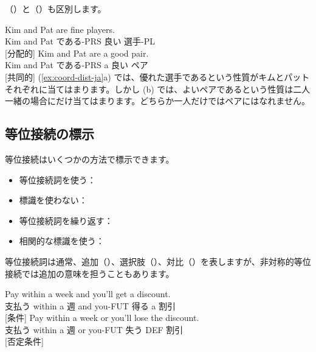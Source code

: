 （）と（）も区別します。

\ea \label{ex:coord-dist-ja}
    \ea \gll Kim and Pat are fine players.\\
        Kim and Pat である-PRS 良い 選手-PL\\
    \glt {} [分配的]
    \ex \gll Kim and Pat are a good pair.\\
        Kim and Pat である-PRS a 良い ペア\\
    \glt {} [共同的]
    \z
\z
(\ref{ex:coord-dist-ja}a) では、優れた選手であるという性質がキムとパットそれぞれに当てはまります。しかし (b) では、よいペアであるという性質は二人一緒の場合にだけ当てはまります。どちらか一人だけではペアにはなれません。

\subsection{等位接続の標示}

等位接続はいくつかの方法で標示できます。
\begin{itemize}[noitemsep]
    \item 等位接続詞を使う：
    \item 標識を使わない：
    \item 等位接続詞を繰り返す：
    \item 相関的な標識を使う：
\end{itemize}

等位接続詞は通常、追加（）、選択肢（）、対比（）を表しますが、非対称的等位接続では追加の意味を担うこともあります。

\ea \label{ex:coord-meaning-ja}
    \ea \gll Pay within a week and you'll get a discount.\\
        支払う within a 週 and you-FUT 得る a 割引\\
    \glt {} [条件]
    \ex \gll Pay within a week or you'll lose the discount.\\
        支払う within a 週 or you-FUT 失う DEF 割引\\
    \glt {} [否定条件]
    \z
\z


